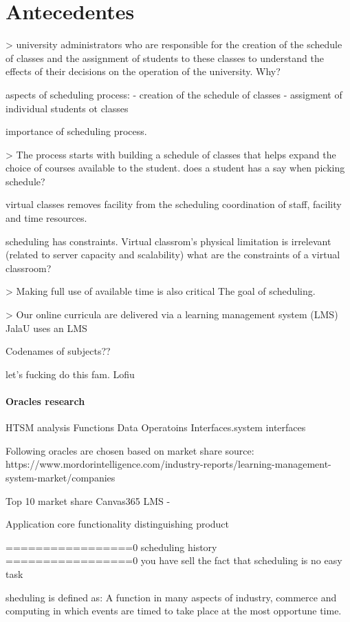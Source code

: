 \section{Antecedentes}

> university administrators who are responsible for the creation of the schedule of classes and the assignment of students to these classes to understand the effects of their decisions on the operation of the university.
Why?

aspects of scheduling process:
    - creation of the schedule of classes
    - assigment of individual students ot classes

importance of scheduling process.

> The process starts with building a schedule of classes that helps expand the choice of courses available to the student.
does a student has a say when picking schedule?

virtual classes removes facility from the scheduling coordination of staff, facility and time resources.

scheduling has constraints. Virtual classrom's physical limitation is irrelevant (related to server capacity and scalability) what are the constraints of a virtual classroom?

> Making full use of available time is also critical
The goal of scheduling.

> Our online curricula are delivered via a learning management system (LMS)
JalaU uses an LMS

Codenames of subjects??


let's fucking do this fam. Lofiu

\paragraph{Oracles research}
HTSM analysis
Functions
Data
Operatoins
Interfaces.system interfaces


Following oracles are chosen based on market share source: https://www.mordorintelligence.com/industry-reports/learning-management-system-market/companies

Top 10 market share
Canvas365 LMS - 

Application
    core functionality
    distinguishing product

=================0
scheduling history
=================0
you have sell the fact that scheduling is no easy task

sheduling is defined as:  A function in many aspects of industry, commerce and computing in which events are timed to take place at the most opportune time. 

